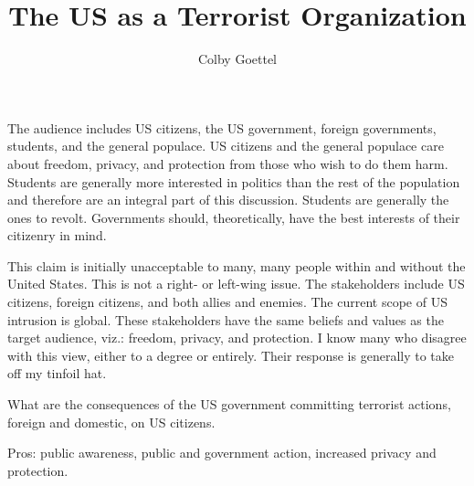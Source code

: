 \documentclass[12pt]{article}
\title{The US as a Terrorist Organization}
\author{Colby Goettel}
\begin{document}
\maketitle



The audience includes US citizens, the US government, foreign governments, students, and the general populace. US citizens and the general populace care about freedom, privacy, and protection from those who wish to do them harm. Students are generally more interested in politics than the rest of the population and therefore are an integral part of this discussion. Students are generally the ones to revolt. Governments should, theoretically, have the best interests of their citizenry in mind.

This claim is initially unacceptable to many, many people within and without the United States. This is not a right- or left-wing issue. The stakeholders include US citizens, foreign citizens, and both allies and enemies. The current scope of US intrusion is global. These stakeholders have the same beliefs and values as the target audience, viz.: freedom, privacy, and protection. I know many who disagree with this view, either to a degree or entirely. Their response is generally to take off my tinfoil hat.

What are the consequences of the US government committing terrorist actions, foreign and domestic, on US citizens.

Pros: public awareness, public and government action, increased privacy and protection.
\end{document}
